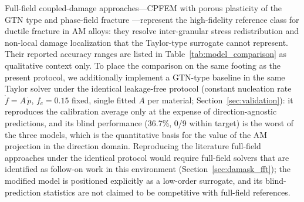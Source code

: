 \documentclass[twocolumn]{sagej}
\begin{document}
Full-field coupled-damage approaches---CPFEM with porous plasticity of the GTN type \cite{zhang2021modeling} and phase-field fracture \cite{liu2022phase}---represent the high-fidelity reference class for ductile fracture in AM alloys: they resolve inter-granular stress redistribution and non-local damage localization that the Taylor-type surrogate cannot represent. Their reported accuracy ranges are listed in Table~\ref{tab:model_comparison} as qualitative context only. To place the comparison on the same footing as the present protocol, we additionally implement a GTN-type baseline in the same Taylor solver under the identical leakage-free protocol (constant nucleation rate $\dot f = A\,\dot p$, $f_c = 0.15$ fixed, single fitted $A$ per material; Section~\ref{sec:validation}): it reproduces the calibration average only at the expense of direction-agnostic predictions, and its blind performance (36.7\%, 0/9 within target) is the worst of the three models, which is the quantitative basis for the value of the AM projection in the direction domain. Reproducing the literature full-field approaches under the identical protocol would require full-field solvers that are identified as follow-on work in this environment (Section~\ref{sec:damask_fft}); the modified model is positioned explicitly as a low-order surrogate, and its blind-prediction statistics are not claimed to be competitive with full-field references.
\end{document}
